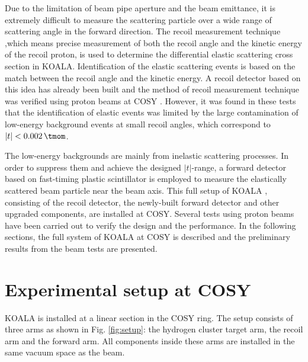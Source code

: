 \documentclass[number,5p]{elsarticle}
\begin{document}
Due to the limitation of beam pipe aperture and the beam emittance,
it is extremely difficult to measure the scattering particle over a wide range of scattering angle in the forward direction.
The recoil measurement technique ,which means precise measurement of both the recoil angle and the kinetic energy of the recoil proton, 
is used to determine the differential elastic scattering cross section in KOALA.
Identification of the elastic scattering events is based on the match between the recoil angle and the kinetic energy.
A recoil detector based on this idea has already been built and the method of recoil measurement technique was verified using proton beams at COSY \cite{recoil_article}.
However, it was found in these tests that the identification of elastic events was limited by the large contamination of low-energy
background events at small recoil angles, which correspond to $|t| < \SI{0.002}{\tmom}$.

The low-energy backgrounds are mainly from inelastic scattering processes.
In order to suppress them and achieve the designed $|t|$-range, a forward detector based on fast-timing plastic scintillator is
employed to measure the elastically scattered beam particle near the beam axis.
This full setup of KOALA , consisting of the recoil detector, the newly-built forward detector and other upgraded components,  are installed at COSY.
Several tests using proton beams have been carried out to verify the design and the performance.
In the following sections,  the full system of KOALA at COSY is described and the preliminary results from the beam tests are presented.

\section{Experimental setup at COSY}
\label{sec:setup}

KOALA is installed at a linear section in the COSY ring.
The setup consists of three arms as shown in Fig. \ref{fig:setup}: the hydrogen
cluster target arm, the recoil arm and the forward arm.
All components inside these arms are installed in the same vacuum space as the beam.
\end{document}
